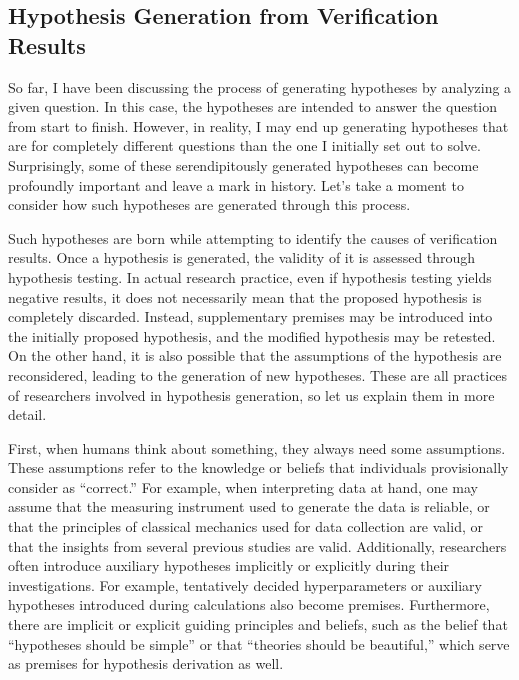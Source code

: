 
\subsection{Hypothesis Generation from Verification Results}
So far, I have been discussing the process of generating hypotheses by analyzing a given question. In this case, the hypotheses are intended to answer the question from start to finish. However, in reality, I may end up generating hypotheses that are for completely different questions than the one I initially set out to solve. Surprisingly, some of these serendipitously generated hypotheses can become profoundly important and leave a mark in history. Let's take a moment to consider how such hypotheses are generated through this process.

Such hypotheses are born while attempting to identify the causes of verification results. Once a hypothesis is generated, the validity of it is assessed through hypothesis testing. In actual research practice, even if hypothesis testing yields negative results, it does not necessarily mean that the proposed hypothesis is completely discarded. Instead, supplementary premises may be introduced into the initially proposed hypothesis, and the modified hypothesis may be retested. On the other hand, it is also possible that the assumptions of the hypothesis are reconsidered, leading to the generation of new hypotheses. These are all practices of researchers involved in hypothesis generation, so let us explain them in more detail.

First, when humans think about something, they always need some assumptions. These assumptions refer to the knowledge or beliefs that individuals provisionally consider as ``correct.'' For example, when interpreting data at hand, one may assume that the measuring instrument used to generate the data is reliable, or that the principles of classical mechanics used for data collection are valid, or that the insights from several previous studies are valid. Additionally, researchers often introduce auxiliary hypotheses implicitly or explicitly during their investigations. For example, tentatively decided hyperparameters or auxiliary hypotheses introduced during calculations also become premises. Furthermore, there are implicit or explicit guiding principles and beliefs, such as the belief that ``hypotheses should be simple'' or that ``theories should be beautiful,'' which serve as premises for hypothesis derivation as well.

